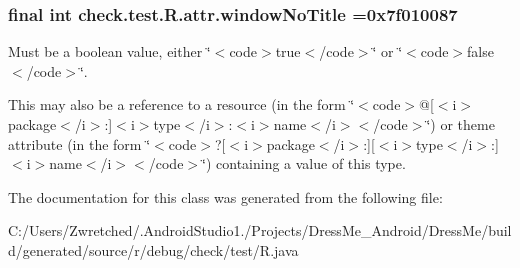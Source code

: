 \subsubsection[{window\+No\+Title}]{\setlength{\rightskip}{0pt plus 5cm}final int check.\+test.\+R.\+attr.\+window\+No\+Title =0x7f010087\hspace{0.3cm}{\ttfamily [static]}}\label{classcheck_1_1test_1_1_r_1_1attr_a29fbabdf31581c8b92ca157f7379b0c4}
Must be a boolean value, either \char`\"{}$<$code$>$true$<$/code$>$\char`\"{} or \char`\"{}$<$code$>$false$<$/code$>$\char`\"{}. 

This may also be a reference to a resource (in the form \char`\"{}$<$code$>$@\mbox{[}$<$i$>$package$<$/i$>$\+:\mbox{]}$<$i$>$type$<$/i$>$\+:$<$i$>$name$<$/i$>$$<$/code$>$\char`\"{}) or theme attribute (in the form \char`\"{}$<$code$>$?\mbox{[}$<$i$>$package$<$/i$>$\+:\mbox{]}\mbox{[}$<$i$>$type$<$/i$>$\+:\mbox{]}$<$i$>$name$<$/i$>$$<$/code$>$\char`\"{}) containing a value of this type. 

The documentation for this class was generated from the following file\+:\begin{DoxyCompactItemize}
\item 
C\+:/\+Users/\+Zwretched/.\+Android\+Studio1./\+Projects/\+Dress\+Me\+\_\+\+Android/\+Dress\+Me/build/generated/source/r/debug/check/test/R.\+java\end{DoxyCompactItemize}
